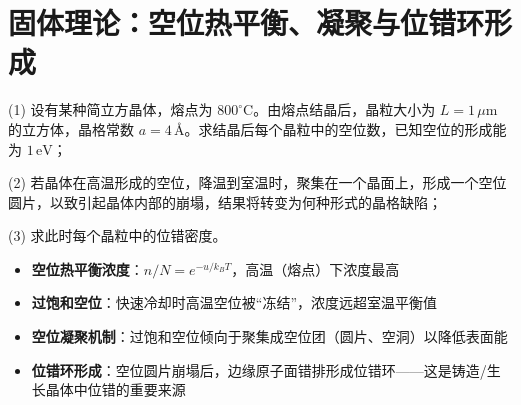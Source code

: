 \section{固体理论：空位热平衡、凝聚与位错环形成}
\label{sec:vacancy-condensation}

\begin{modelbox}[题目：空位热平衡浓度与空位圆片崩塌]
(1) 设有某种简立方晶体，熔点为 $800^{\circ}\mathrm{C}$。由熔点结晶后，晶粒大小为 $L=1\,\mu\mathrm{m}$ 的立方体，晶格常数 $a=4\,\text{\AA}$。求结晶后每个晶粒中的空位数，已知空位的形成能为 $1\,\mathrm{eV}$；

(2) 若晶体在高温形成的空位，降温到室温时，聚集在一个晶面上，形成一个空位圆片，以致引起晶体内部的崩塌，结果将转变为何种形式的晶格缺陷；

(3) 求此时每个晶粒中的位错密度。
\end{modelbox}

\begin{tipbox}[考点快速分析]
\begin{itemize}
    \item \textbf{空位热平衡浓度}：$n/N=e^{-u/k_{\!B}T}$，高温（熔点）下浓度最高
    \item \textbf{过饱和空位}：快速冷却时高温空位被``冻结''，浓度远超室温平衡值
    \item \textbf{空位凝聚机制}：过饱和空位倾向于聚集成空位团（圆片、空洞）以降低表面能
    \item \textbf{位错环形成}：空位圆片崩塌后，边缘原子面错排形成位错环——这是铸造/生长晶体中位错的重要来源
\end{itemize}
\end{tipbox}

